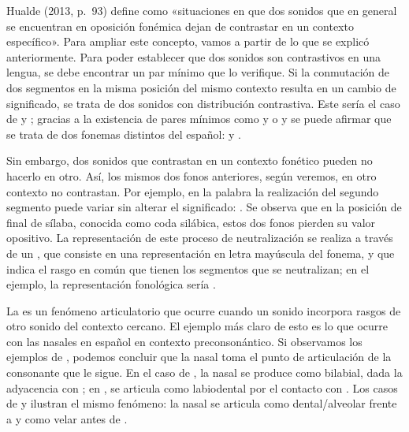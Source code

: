 Hualde (2013, p.~93)
define  como «situaciones en que dos sonidos que en
general se encuentran en oposición fonémica dejan de contrastar en un contexto
específico». Para ampliar este concepto, vamos a partir de lo que se explicó
anteriormente. Para poder establecer que dos sonidos son contrastivos en una
lengua, se debe encontrar un par mínimo que lo verifique. Si la conmutación de
dos segmentos en la misma posición del mismo contexto resulta en un cambio de
significado, se trata de dos sonidos con distribución contrastiva. Este sería el
caso de  y ; gracias a la existencia de pares mínimos como
 y  o  y  se puede afirmar que se
trata de dos fonemas distintos del español:  y .

Sin embargo, dos sonidos que contrastan en un contexto fonético pueden no
hacerlo en otro. Así, los mismos dos fonos anteriores, según veremos, en otro
contexto no contrastan. Por ejemplo, en la palabra  la realización
del segundo segmento puede variar sin alterar el significado: 
. Se observa que en la posición de final de sílaba, conocida como
coda silábica, estos dos fonos pierden su valor opositivo. La representación de
este proceso de neutralización se realiza a través de un
, que consiste en una representación en letra mayúscula
del fonema, y que indica el rasgo en común que tienen los segmentos que se
neutralizan; en el ejemplo, la representación fonológica sería
.

La  es un fenómeno articulatorio que ocurre cuando un
sonido incorpora rasgos de otro sonido del contexto cercano. El ejemplo más
claro de esto es lo que ocurre con las nasales en español en contexto
preconsonántico. Si observamos los ejemplos de , podemos
concluir que la nasal toma el punto de articulación de la consonante que le
sigue. En el caso de , la nasal se produce como bilabial,
dada la adyacencia con ; en , se articula como
labiodental por el contacto con . Los casos de  y
 ilustran el mismo fenómeno: la nasal se articula como
dental/alveolar frente a  y como velar antes de .

\begin{exe}
  \ex\label{ex:03-nasales}
    \begin{xlist}
      \ex\label{ex:03-nasales-a}   
      \ex\label{ex:03-nasales-b}   
      \ex\label{ex:03-nasales-c}  
      \ex\label{ex:03-nasales-d}   
    \end{xlist}
\end{exe}

